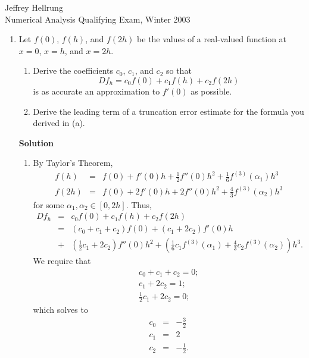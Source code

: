 \documentclass{article}
\begin{document}
\begin{flushright}
Jeffrey Hellrung \\
Numerical Analysis Qualifying Exam, Winter 2003 \\
\end{flushright}


\begin{enumerate}

\item Let \(f(0)\), \(f(h)\), and \(f(2h)\) be the values of a real-valued function at \(x = 0\), \(x = h\), and \(x = 2h\).

\begin{enumerate}
\item Derive the coefficients \(c_0\), \(c_1\), and \(c_2\) so that
\[Df_h = c_0 f(0) + c_1 f(h) + c_2 f(2h)\]
is as accurate an approximation to \(f'(0)\) as possible.

\item Derive the leading term of a truncation error estimate for the formula you derived in (a).

\end{enumerate}

{\bf Solution}

\begin{enumerate}
\item By Taylor's Theorem,
\begin{eqnarray*}
f(h) & = & f(0) + f'(0) h + \frac{1}{2} f''(0) h^2 + \frac{1}{6} f^{(3)}(\alpha_1) h^3 \\
f(2h) & = & f(0) + 2 f'(0) h + 2 f''(0) h^2 + \frac{4}{3} f^{(3)}(\alpha_2) h^3
\end{eqnarray*}
for some \(\alpha_1,\alpha_2 \in [0,2h]\).  Thus,
\begin{eqnarray*}
Df_h & = & c_0 f(0) + c_1 f(h) + c_2 f(2h) \\
     & = & (c_0 + c_1 + c_2) f(0)
         + (c_1 + 2 c_2) f'(0) h \\
     & + & \left( \frac{1}{2} c_1 + 2 c_2 \right) f''(0) h^2
         + \left( \frac{1}{6} c_1 f^{(3)}(\alpha_1) + \frac{4}{3} c_2 f^{(3)}(\alpha_2) \right) h^3.
\end{eqnarray*}
We require that
\begin{eqnarray*}
c_0 + c_1 + c_2 = 0; \\
c_1 + 2 c_2 = 1; \\
\frac{1}{2} c_1 + 2 c_2 = 0;
\end{eqnarray*}
which solves to
\begin{eqnarray*}
c_0 & = & -\frac{3}{2} \\
c_1 & = & 2 \\
c_2 & = & -\frac{1}{2}.
\end{eqnarray*}


\end{enumerate}
\end{enumerate}
\end{document}
